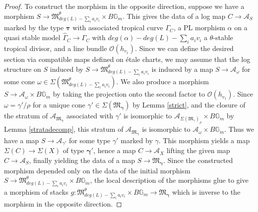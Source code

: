 \documentclass[12pt, oneside]{amsart}   	%
\numberwithin{equation}{section}
\numberwithin{thm}{section}
\numberwithin{figure}{section}
\begin{document}
\begin{proof}
To construct the morphism in the opposite direction, suppose we have a morphism $S \rightarrow \mathfrak{M}^\theta_{deg(L) -\sum_i a_iv_i} \times B\mathbb{G}_m$. This gives the data of a log map $C \rightarrow \mathcal{A}_S$ marked by the type $\pmb\tau$ with associated tropical curve $\Gamma_C$, a PL morphism $\alpha$ on a quasi stable model $\widehat{\Gamma}_C \rightarrow \Gamma_C$ with $deg(\alpha) - deg(L) -\sum_i a_iv_i$ a $\theta$-stable tropical divisor, and a line bundle $\mathcal{O}(h_{v_1})$. Since we can define the desired section via compatible maps defined on \'etale charts, we may assume that the log structure on $S$ induced by $S \rightarrow \mathfrak{M}^\theta_{deg(L) -\sum_i a_iv_i}$ is induced by a map $S \rightarrow \mathcal{A}_{\omega}$ for some cone $\omega \in \Sigma( \mathfrak{M}^\theta_{deg(L) -\sum_i a_iv_i})$. We also produce a morphism $S \rightarrow \mathcal{A}_\omega \times B\mathbb{G}_m$ by taking the projection onto the second factor to $\mathcal{O}(h_{v_1})$. Since $\omega = \gamma'/\rho$ for a unique cone $\gamma' \in \Sigma(\mathfrak{M}_{\pmb\gamma})$ by Lemma \ref{strict}, and the closure of the stratum of $\mathcal{A}_{\mathfrak{M}_{\pmb\gamma}}$ associated with $\gamma'$ is isomorphic to $\mathcal{A}_{\Sigma(\mathfrak{M}_{\gamma})_{\rho}} \times B\mathbb{G}_m$ by Lemma \ref{stratadecomp}, this stratum of $\mathcal{A}_{\mathfrak{M}_{\pmb\gamma}}$ is isomorphic to $\mathcal{A}_{\omega}\times B\mathbb{G}_m$. Thus we have a map $S \rightarrow \mathcal{A}_{\gamma'}$ for some type $\gamma'$ marked by $\gamma$. This morphism yields a map $\Sigma(C) \rightarrow \Sigma(X)$ of type $\pmb\gamma'$, hence a map $C \rightarrow \mathcal{A}_X$ lifting the given map $C \rightarrow \mathcal{A}_S$, finally yielding the data of a map $S \rightarrow \mathfrak{M}_{\pmb\gamma}$. Since the constructed morphism depended only on the data of the initial morphism $S \rightarrow \mathfrak{M}^{\theta}_{deg(L) -\sum_i a_iv_i} \times B\mathbb{G}_m$, the local description of the morphisms glue to give a morphism of stacks $g: \mathfrak{M}^\theta_{deg(L) -\sum_i a_iv_i} \times B\mathbb{G}_m \rightarrow \mathfrak{M}_{\pmb\gamma}$ which is inverse to the morphism in the opposite direction. 


\end{proof}
\end{document}
